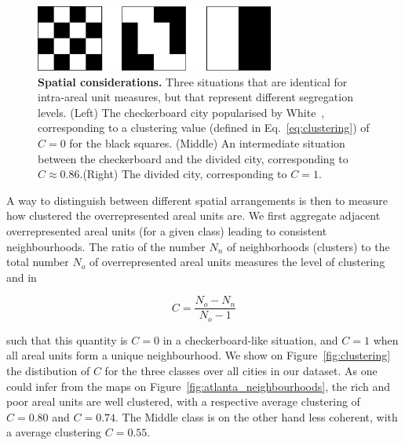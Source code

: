 \begin{figure}[!h]
    \centering
    \includegraphics[width=0.7\textwidth]{./gfx/chapter-segregation/figure5.pdf}
    \caption{{\bf Spatial considerations.} Three situations that are identical for intra-areal unit measures,
        but that represent different segregation levels. (Left) The checkerboard
        city popularised by White~\cite{White:1983}, corresponding to a
        clustering value (defined in Eq.~\ref{eq:clustering}) of $C=0$ for the black squares. (Middle) An
        intermediate situation between the checkerboard and the divided city,
        corresponding to $C \approx 0.86$.(Right) The divided city, corresponding to
        $C=1$. \label{fig:checkerboard}} 
\end{figure}


A way to distinguish between different spatial arrangements is then to measure
how clustered the overrepresented areal units are. We first aggregate adjacent
overrepresented areal units (for a given class) leading to consistent
neighbourhoods. The ratio of the number $N_n$ of neighborhoods (clusters) to the
total number $N_o$ of overrepresented areal units measures the level of
clustering and in 

\begin{equation} 
    C = \frac{N_{o}-N_{n}}{N_{o}-1}
    \label{eq:clustering}
\end{equation}


such that this quantity is $C = 0$ in a checkerboard-like situation, and $C = 1$
when all areal units form a unique neighbourhood. We show on
Figure~\ref{fig:clustering} the distibution of $C$ for the three classes over all
cities in our dataset. As one could infer from the maps on
Figure~\ref{fig:atlanta_neighbourhoods}, the rich and poor areal units are well
clustered, with a respective average clustering of $C = 0.80$ and $C = 0.74$.
The Middle class is on the other hand less coherent, with a average clustering
$C = 0.55$.\\

